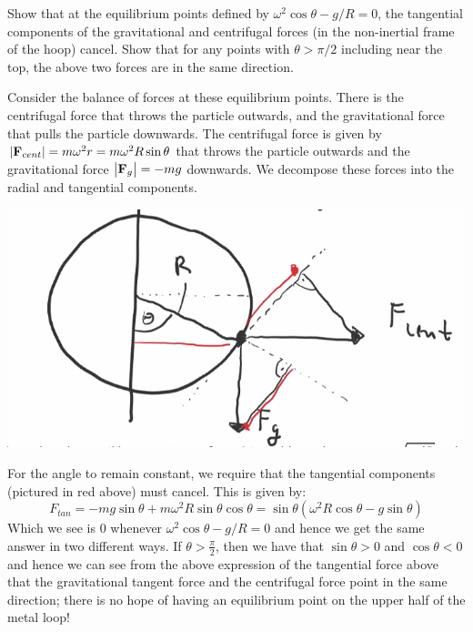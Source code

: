 \begin{p}
Show that at the equilibrium points defined by $\omega^2\cos\theta - g/R = 0$, the tangential components of the gravitational and centrifugal forces (in the non-inertial frame of the hoop) cancel. Show that for any points with $\theta > \pi/2$ including near the top, the above two forces are in the same direction.
\end{p}
\begin{s}
Consider the balance of forces at these equilibrium points. There is the centrifugal force that throws the particle outwards, and the gravitational force that pulls the particle downwards. The centrifugal force is given by $\abs{\mathbf{F}_{cent}} = m\omega^2r = m\omega^2R\sin\theta$ that throws the particle outwards and the gravitational force $\abs{\mathbf{F}_g}= -mg$ downwards. We decompose these forces into the radial and tangential components.
\begin{center}
    \includegraphics[scale=0.4]{Lecture-5/W5-img3.png}
\end{center}
For the angle to remain constant, we require that the tangential components (pictured in red above) must cancel. This is given by:
\[F_{tan} = -mg\sin\theta + m\omega^2R\sin\theta\cos\theta = \sin\theta\left(\omega^2 R\cos\theta - g\sin\theta\right)\]
Which we see is $0$ whenever $\omega^2\cos\theta - g/R = 0$ and hence we get the same answer in two different ways. 
If $\theta > \frac{\pi}{2}$, then we have that $\sin\theta > 0$ and $\cos\theta < 0$ and hence we can see from the above expression of the tangential force above that the gravitational tangent force and the centrifugal force point in the same direction; there is no hope of having an equilibrium point on the upper half of the metal loop!
\end{s}

